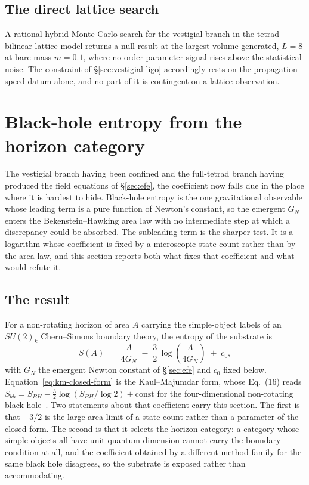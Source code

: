 \documentclass[aps,prd,nofootinbib,superscriptaddress,12pt]{revtex4-2}
\begin{document}
\subsection{The direct lattice search}
\label{sec:vestigial-lattice}

A rational-hybrid Monte Carlo search for the vestigial branch in the
tetrad-bilinear lattice model returns a null result at the largest volume
generated, $L = 8$ at bare mass $m = 0.1$, where no order-parameter
signal rises above the statistical noise. The constraint of
\S\ref{sec:vestigial-ligo} accordingly rests on the propagation-speed
datum alone, and no part of it is contingent on a lattice observation.

\section{Black-hole entropy from the horizon category}
\label{sec:entropy}

The vestigial branch having been confined and the full-tetrad branch having
produced the field equations of \S\ref{sec:efe}, the coefficient now falls due
in the place where it is hardest to hide. Black-hole entropy is the one
gravitational observable whose leading term is a pure function of Newton's
constant, so the emergent $G_N$ enters the Bekenstein--Hawking area law with no
intermediate step at which a discrepancy could be absorbed. The subleading term
is the sharper test. It is a logarithm whose coefficient is fixed by a
microscopic state count rather than by the area law, and this section reports
both what fixes that coefficient and what would refute it.

\subsection{The result}
\label{sec:entropy-result}

For a non-rotating horizon of area $A$ carrying the simple-object labels of an
$SU(2)_k$ Chern--Simons boundary theory, the entropy of the substrate is
\begin{equation}
\label{eq:km-closed-form}
S(A) \;=\; \frac{A}{4G_N} \;-\; \frac{3}{2}\,\log\!\left(\frac{A}{4G_N}\right) \;+\; c_0 ,
\end{equation}
with $G_N$ the emergent Newton constant of \S\ref{sec:efe} and $c_0$ fixed below.
Equation~\eqref{eq:km-closed-form} is the Kaul--Majumdar form, whose Eq.~(16) reads
$S_{bh} = S_{BH} - \tfrac{3}{2}\log(S_{BH}/\log 2) + \mathrm{const}$ for the
four-dimensional non-rotating black hole~\cite{KaulMajumdar2000}. Two statements about
that coefficient carry this section. The first is that $-3/2$ is the large-area limit of a
state count rather than a parameter of the closed form. The second is that it selects the
horizon category: a category whose simple objects all have unit quantum dimension cannot
carry the boundary condition at all, and the coefficient obtained by a different method
family for the same black hole disagrees, so the substrate is exposed rather than
accommodating.
\end{document}
